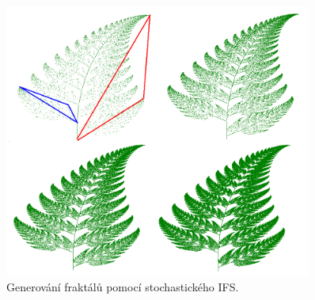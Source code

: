 \documentclass[thesis=B, czech]{FITthesis}[2019/03/06]
\begin{document}
\begin{figure}[h]
\centering
    \includegraphics[width=0.9\textwidth]{images/barnsley.png}
      \caption{ \label{fig:fern}Generování fraktálů pomocí stochastického IFS.}
\end{figure}

\newpage
\end{document}

